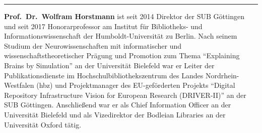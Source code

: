 \documentclass[a4paper,
fontsize=11pt,
oneside,
numbers=noperiodatend,
parskip=half-,
bibliography=totoc,
final
]{scrartcl}
\begin{document}
\begin{center}\rule{0.5\linewidth}{\linethickness}\end{center}

\textbf{Prof.~Dr.~Wolfram Horstmann} ist seit 2014 Direktor der SUB
Göttingen und seit 2017 Honorarprofessor am Institut für Bibliotheks-
und Informationswissenschaft der Humboldt-Universität zu Berlin. Nach
seinem Studium der Neurowissenschaften mit informatischer und
wissenschaftstheoretischer Prägung und Promotion zum Thema ``Explaining
Brains by Simulation'' an der Universität Bielefeld war er Leiter der
Publikationsdienste im Hochschulbibliothekszentrum des Landes
Nordrhein-Westfalen (hbz) und Projektmanager des EU-geförderten Projekts
\enquote{Digital Repository
Infrastructure Vision for European Research (DRIVER-II)} an der SUB
Göttingen. Anschließend war er als Chief Information Officer an der
Universität Bielefeld und als Vizedirektor der Bodleian Libraries an der
Universität Oxford tätig.
\end{document}
